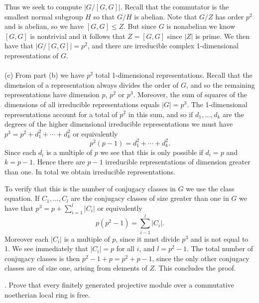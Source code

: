 \documentclass[11pt]{article}
\begin{document}
Thus we seek to compute $|G/[G,G]|$. Recall that the commutator is the smallest normal subgroup $H$ so that $G/H$ is abelian. Note that $G/Z$ has order $p^2$ and is abelian, so we have $[G,G]\le Z$. But since $G$ is nonabelian we know $[G,G]$ is nontrivial and it follows that $Z = [G,G]$ since $|Z|$ is prime. We then have that $|G/[G,G]| = p^2$, and there are  irreducible complex 1-dimensional representations of $G$.\\\\
(c) 
From part (b) we have $p^2$ total 1-dimensional representations. Recall that the dimension of a representation always divides the order of $G$, and so the remaining representations have dimension $p$, $p^2$ or $p^3$. Moreover, the sum of squares of the dimensions of all irreducible representations equals $|G| = p^3$. The 1-dimensional representations account for a total of $p^2$ in this sum, and so if $d_1,\ldots, d_k$ are the degrees of the higher dimensional irreducible representations we must have $
p^3 = p^2 + d_1^2+ \cdots + d_k^2$
or equivalently \[
p^2(p-1) = d_1^2+\cdots + d_k^2.
\]
Since each $d_i$ is a multiple of $p$ we see that this is only possible if $d_i = p$ and $k= p-1$. Hence there are $p-1$ irreducible representations of dimension greater than one. In total we obtain  irreducible representations. 

To verify that this is the number of conjugacy classes in $G$ we use the class equation. If $C_1,\ldots, C_l$ are the conjugacy classes of size greater than one in $G$ we have that $
p^3 = p + \sum_{i=1}^l |C_i|
$
or equivalently \[
p(p^2-1) = \sum_{i-1}^l |C_i|.
\]
Moreover each $|C_i|$ is a multiple of $p$, since it must divide $p^3$ and is not equal to 1. We see immediately that $|C_i| = p$ for all $i$, and $l = p^2-1$. The total number of conjugacy classes is then $p^2-1+p = p^2+p-1$, since the only other conjugacy classes are of size one, arising from elements of $Z$. This concludes the proof. 

.  Prove that every finitely generated projective module over a commutative
noetherian local ring is free.
\end{document}
